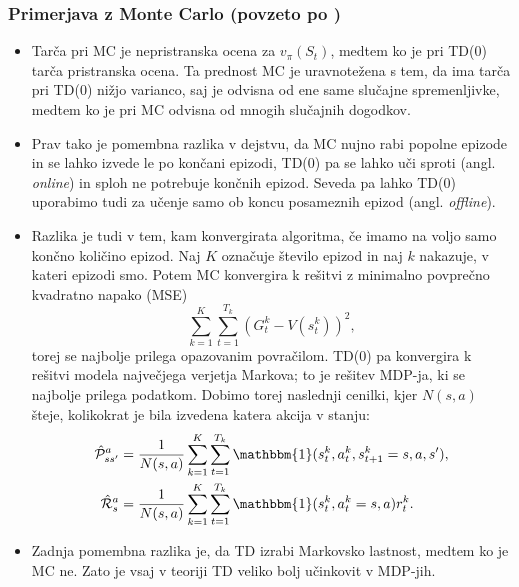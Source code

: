 \documentclass[12pt,a4paper]{amsart}
\theoremstyle{definition} %
\theoremstyle{plain} %
\begin{document}
\subsubsection{Primerjava z Monte Carlo (povzeto po \cite{LecNotesSilver})}
\begin{itemize}
    \item Tarča pri MC je nepristranska ocena za $v_\pi(S_t)$, medtem ko je pri TD($0$) tarča 
    pristranska ocena. Ta prednost MC je uravnotežena s tem, da ima tarča pri TD($0$) nižjo varianco, 
    saj je odvisna od ene same slučajne spremenljivke, medtem ko je pri MC odvisna od mnogih 
    slučajnih dogodkov.
    
    \item Prav tako je pomembna razlika v dejstvu, da MC nujno rabi popolne epizode in se lahko
    izvede le po končani epizodi, TD($0$) pa se lahko uči sproti (angl. \textit{online}) in sploh 
    ne potrebuje končnih epizod. Seveda pa lahko TD($0$) uporabimo tudi za učenje samo ob koncu 
    posameznih epizod (angl. \textit{offline}).

    \item Razlika je tudi v tem, kam konvergirata algoritma, če imamo na voljo samo končno 
    količino epizod. Naj $K$ označuje število epizod in naj $k$ nakazuje, v kateri epizodi smo. Potem 
    MC konvergira k rešitvi z minimalno povprečno kvadratno napako (MSE) 
    $$
    \sum_{k=1}^K \sum_{t=1}^{T_k} (G_t^k - V(s_t^k))^2,
    $$
    torej se najbolje prilega opazovanim povračilom. TD($0$) pa konvergira k rešitvi modela največjega 
    verjetja Markova; to je rešitev MDP-ja, ki se najbolje prilega podatkom. Dobimo torej naslednji 
    cenilki, kjer $N(s, a)$ šteje, kolikokrat je bila izvedena katera akcija v stanju:
    \begin{align*}
        \hat{\mathcal{P}}_{ss'}^a &= \frac{1}{N(s, a)} \sum_{k=1}^K \sum_{t=1}^{T_k} 
                \mathbbm{1}(s_t^k, a_t^k, s_{t+1}^k = s, a, s'), \\
        \hat{\mathcal{R}}_{s}^a &= \frac{1}{N(s, a)} \sum_{k=1}^K \sum_{t=1}^{T_k} 
                \mathbbm{1}(s_t^k, a_t^k = s, a)r_t^k.
    \end{align*}

    \item Zadnja pomembna razlika je, da TD izrabi Markovsko lastnost, medtem ko je MC ne. Zato je 
    vsaj v teoriji TD veliko bolj učinkovit v MDP-jih.
\end{itemize}
\end{document}
